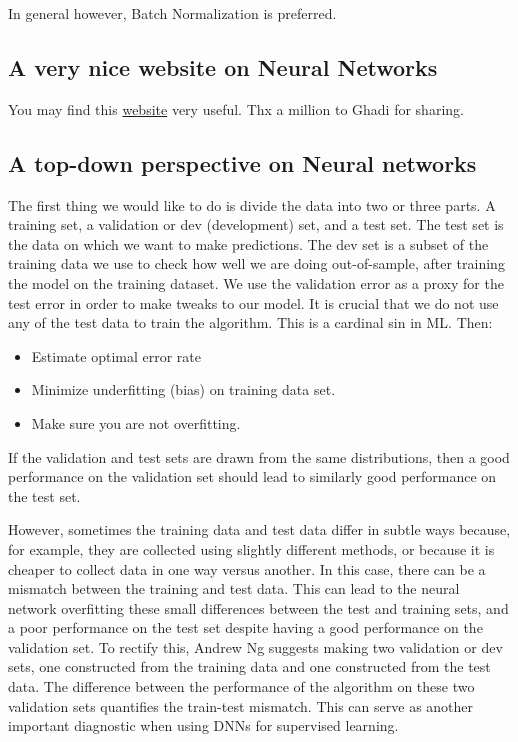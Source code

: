 \documentclass[%
oneside,                 %
final,                   %
10pt]{article}
\begin{document}
In general however, Batch
Normalization is preferred.

\subsection{A very nice website on Neural Networks}

You may find this \href{{https://playground.tensorflow.org/#activation=tanh&batchSize=10&dataset=circle&regDataset=reg-plane&learningRate=0.03&regularizationRate=0&noise=0&networkShape=4,2&seed=0.29243&showTestData=false&discretize=false&percTrainData=50&x=true&y=true&xTimesY=false&xSquared=false&ySquared=false&cosX=false&sinX=false&cosY=false&sinY=false&collectStats=false&problem=classification&initZero=false&hideText=false}}{website} very useful. Thx a million to Ghadi for sharing. 

\subsection{A top-down perspective on Neural networks}

The first thing we would like to do is divide the data into two or three
parts. A training set, a validation or dev (development) set, and a
test set. The test set is the data on which we want to make
predictions. The dev set is a subset of the training data we use to
check how well we are doing out-of-sample, after training the model on
the training dataset. We use the validation error as a proxy for the
test error in order to make tweaks to our model. It is crucial that we
do not use any of the test data to train the algorithm. This is a
cardinal sin in ML. Then:

\begin{itemize}
\item Estimate optimal error rate

\item Minimize underfitting (bias) on training data set.

\item Make sure you are not overfitting.
\end{itemize}

\noindent
If the validation and test sets are drawn from the same distributions,
then a good performance on the validation set should lead to similarly
good performance on the test set. 

However, sometimes
the training data and test data differ in subtle ways because, for
example, they are collected using slightly different methods, or
because it is cheaper to collect data in one way versus another. In
this case, there can be a mismatch between the training and test
data. This can lead to the neural network overfitting these small
differences between the test and training sets, and a poor performance
on the test set despite having a good performance on the validation
set. To rectify this, Andrew Ng suggests making two validation or dev
sets, one constructed from the training data and one constructed from
the test data. The difference between the performance of the algorithm
on these two validation sets quantifies the train-test mismatch. This
can serve as another important diagnostic when using DNNs for
supervised learning.
\end{document}
